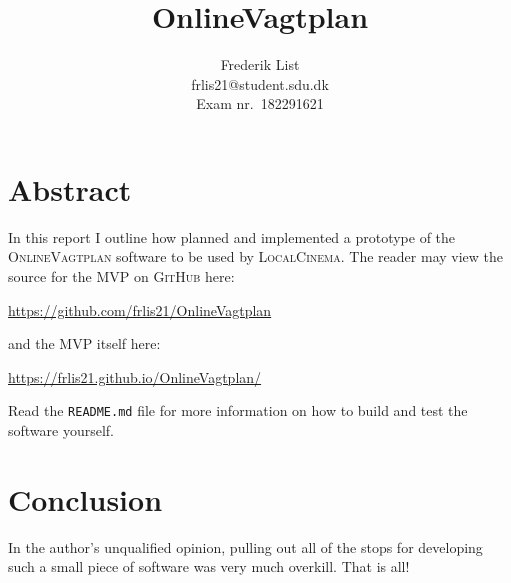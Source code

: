\documentclass{report}
\title{OnlineVagtplan}
\author{
	Frederik List \\
	\small frlis21@student.sdu.dk \\
	\small Exam nr.\ 182291621
}
\begin{document}
\maketitle

\chapter*{Abstract}

In this report I outline how planned and implemented a prototype of the \textsc{OnlineVagtplan}
software to be used by \textsc{LocalCinema}.
The reader may view the source for the MVP on \textsc{GitHub} here:
\begin{center}
	\url{https://github.com/frlis21/OnlineVagtplan}
\end{center}
and the MVP itself here:
\begin{center}
	\url{https://frlis21.github.io/OnlineVagtplan/}
\end{center}
Read the \texttt{README.md} file for more information
on how to build and test the software yourself.





\chapter*{Conclusion}

In the author's unqualified opinion,
pulling out all of the stops for developing such a small piece of software
was very much overkill. That is all!

\appendix


\end{document}
